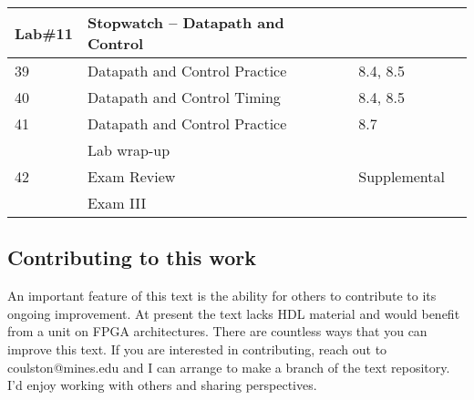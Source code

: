 \begin{longtable}{|l|m{7cm}|l|l|}
 \rowcolor{yellow} 
Lab\#11	& Stopwatch -- Datapath and Control  & \\ \hline
39			& Datapath and Control Practice  & 8.4, 8.5 \\ \hline
40			& Datapath and Control Timing  & 8.4, 8.5 \\ \hline
41			& Datapath and Control Practice  & 8.7 \\ \hline
 \rowcolor{yellow} 
			& Lab wrap-up &  \\ \hline
42			& Exam Review &  Supplemental \\ \hline
			& Exam III & & \\ \hline
\end{longtable}

\subsection{Contributing to this work}
An important feature of this text is the ability for others to contribute to its ongoing improvement.
At present the text lacks HDL material and would benefit from a unit on FPGA architectures.  There
are countless ways that you can improve this text.  If you are interested in contributing, reach out 
to coulston@mines.edu and I can arrange to make a branch of the text repository.  I'd enjoy 
working with others and sharing perspectives.






